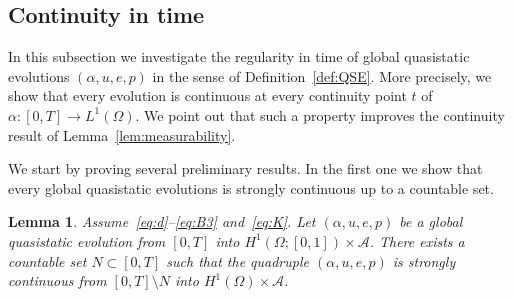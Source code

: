 \documentclass[reqno]{amsart}
\newtheorem{lemma}[corollary]{Lemma}
\theoremstyle{definition}
\numberwithin{equation}{section}
\begin{document}
\subsection{Continuity in time}

In this subsection we investigate the regularity in time of global quasistatic evolutions $(\alpha,u,e,p)$ in the sense of Definition~\ref{def:QSE}. More precisely, we show that every evolution is continuous at every continuity point $t$ of $\alpha\colon [0,T]\to L^1(\Omega)$. We point out that such a property improves the continuity result of Lemma~\ref{lem:measurability}.

We start by proving several preliminary results. In the first one we show that every global quasistatic evolutions is strongly continuous up to a countable set.

\begin{lemma}\label{lem:continuity}
Assume~\eqref{eq:d}--\eqref{eq:B3} and~\eqref{eq:K}. Let $(\alpha,u,e,p)$ be a global quasistatic evolution from $[0,T]$ into $H^1(\Omega;[0,1])\times\mathcal A$. There exists a countable set $N\subset [0,T]$ such that the quadruple $(\alpha,u,e,p)$ is strongly continuous from $[0,T]\setminus N$ into $H^1(\Omega)\times \mathcal A$. 
\end{lemma}
\end{document}
